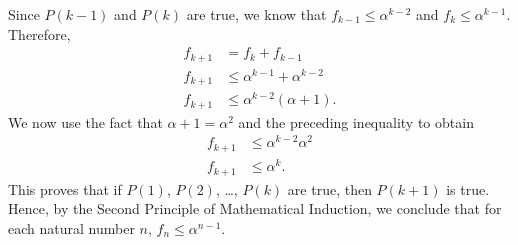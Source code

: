 \begin{enumerate}
\begin{myproof}
Since $P( k -1 )$ and $P ( k )$ are true, we know that 
$f_{k-1} \leq \alpha^{k-2}$ and $f_k \leq \alpha^{k-1}$.  Therefore,
\[
\begin{aligned}
f_{k + 1} &= f_k + f_{k-1} \\
f_{k + 1} &\leq \alpha^{k-1} + \alpha^{k-2} \\
f_{k + 1} &\leq \alpha^{k-2} \left(\alpha + 1 \right)\!.
\end{aligned}
\]
We now use the fact that $\alpha + 1 = \alpha^2$ and the preceding inequality to obtain
\[
\begin{aligned}
f_{k+1} &\leq \alpha^{k-2} \alpha^2 \\
f_{k+1} &\leq \alpha^k.
\end{aligned}
\]
This proves that if $P( 1 )$, $P( 2 )$, \ldots , $P( k )$ are true, then $P(k + 1 )$ is true.  Hence, by the Second Principle of Mathematical Induction, we conclude that for each natural number $n$, $f_n \leq \alpha^{n-1}$\!.
\end{myproof}
\end{enumerate}



